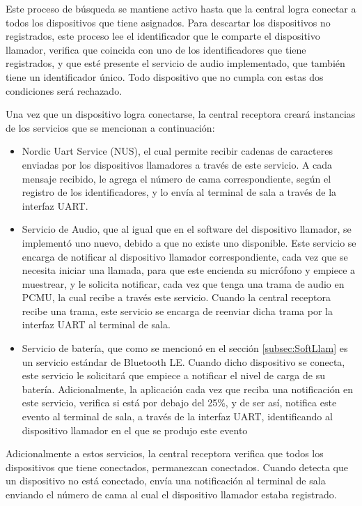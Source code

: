 Este proceso de búsqueda se mantiene activo hasta que la central logra conectar a todos los dispositivos que tiene asignados. Para descartar los dispositivos no registrados, este proceso lee el identificador que le comparte el dispositivo llamador, verifica que coincida con uno de los identificadores que tiene registrados, y que esté presente el servicio de audio implementado, que también tiene un identificador único. Todo dispositivo que no cumpla con estas dos condiciones será rechazado.

Una vez que un dispositivo logra conectarse, la central receptora creará instancias de los servicios que se mencionan a continuación:

\begin{itemize}

\item Nordic Uart Service (NUS), el cual permite recibir cadenas de caracteres enviadas por los dispositivos llamadores a través de este servicio. A cada mensaje recibido, le agrega el número de cama correspondiente, según el registro de los identificadores, y lo envía al terminal de sala a través de la interfaz UART.

\item Servicio de Audio, que al igual que en el software del dispositivo llamador, se implementó uno nuevo, debido a que no existe uno disponible. Este servicio se encarga de notificar al dispositivo llamador correspondiente, cada vez que se necesita iniciar una llamada, para que este encienda su micrófono y empiece a muestrear, y le solicita notificar, cada vez que tenga una trama de audio en PCMU, la cual recibe a través este servicio. Cuando la central receptora recibe una trama, este servicio se encarga de reenviar dicha trama por la interfaz UART al terminal de sala.

\item Servicio de batería, que como se mencionó en el sección \ref{subsec:SoftLlam} es un servicio estándar de Bluetooth LE. Cuando dicho dispositivo se conecta, este servicio le solicitará que empiece a notificar el nivel de carga de su batería. Adicionalmente, la aplicación cada vez que reciba una notificación en este servicio, verifica si está por debajo del 25\%, y de ser así, notifica este evento al terminal de sala, a través de la interfaz UART, identificando al dispositivo llamador en el que se produjo este evento

\end{itemize}

Adicionalmente a estos servicios, la central receptora verifica que todos los dispositivos que tiene conectados, permanezcan conectados. Cuando detecta que un dispositivo no está conectado, envía una notificación al terminal de sala enviando el número de cama al cual el dispositivo llamador estaba registrado.

